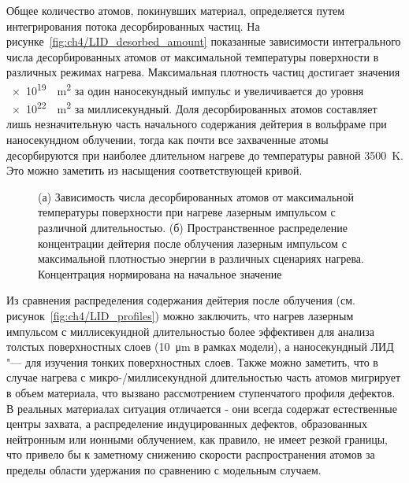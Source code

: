 Общее количество атомов, покинувших материал, определяется путем интегрирования потока десорбированных частиц. На рисунке~\cref{fig:ch4/LID_desorbed_amount} показанные зависимости интегрального числа десорбированных атомов от максимальной температуры поверхности в различных режимах нагрева. Максимальная плотность частиц достигает значения \SI{e19}{\per\meter\squared} за один наносекундный импульс и увеличивается до уровня \SI{e22}{\per\meter\squared} за миллисекундный. Доля десорбированных атомов составляет лишь незначительную часть начального содержания дейтерия в вольфраме при наносекундном облучении, тогда как почти все захваченные атомы десорбируются при наиболее длительном нагреве до температуры равной \SI{3500}{\kelvin}. Это можно заметить из насыщения соответствующей кривой.

\begin{figure}[ht]
    \caption{(а) Зависимость числа десорбированных атомов от максимальной температуры поверхности при нагреве лазерным импульсом с различной длительностью. (б) Пространственное распределение концентрации дейтерия после облучения лазерным импульсом с максимальной плотностью энергии в различных сценариях нагрева. Концентрация нормирована на начальное значение}
\end{figure}

Из сравнения распределения содержания дейтерия после облучения (см. рисунок~\cref{fig:ch4/LID_profiles}) можно заключить, что нагрев лазерным импульсом с миллисекундной длительностью более эффективен для анализа толстых поверхностных слоев (\SI{10}{\micro\meter} в рамках модели), а наносекундный ЛИД "--- для изучения тонких поверхностных слоев. Также можно заметить, что в случае нагрева с микро-/миллисекундной длительностью часть атомов мигрирует в объем материала, что вызвано рассмотрением ступенчатого профиля дефектов. В реальных материалах ситуация отличается - они всегда содержат естественные центры захвата, а распределение индуцированных дефектов, образованных нейтронным или ионными облучением, как правило, не имеет резкой границы, что привело бы к заметному снижению скорости распространения атомов за пределы области удержания по сравнению с модельным случаем.

